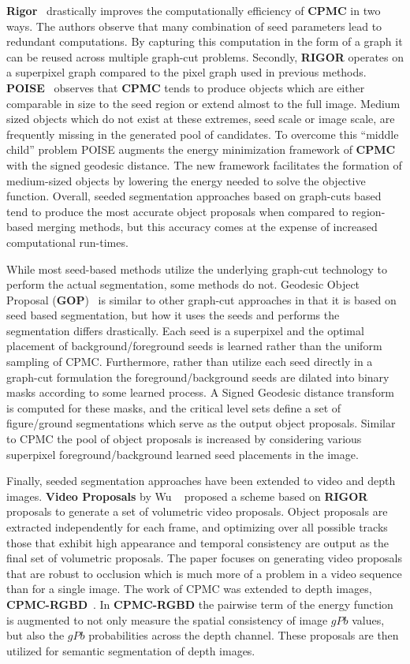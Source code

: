 {\bf Rigor}~\cite{Humayun:etal:CVPR14} drastically improves the computationally efficiency of {\bf CPMC} in two ways. The authors observe that many combination of seed parameters lead to redundant computations. By capturing this computation in the form of a graph it can be reused across multiple graph-cut problems. Secondly, {\bf RIGOR} operates on a superpixel graph compared to the pixel graph used in previous methods. {\bf POISE}~\cite{Humayun:etal:ICCV15} observes that {\bf CPMC} tends to produce objects which are either comparable in size to the seed region or extend almost to the full image. Medium sized objects which do not exist at these extremes, seed scale or image scale, are frequently missing in the generated pool of candidates. To overcome this ``middle child'' problem POISE augments the energy minimization framework of {\bf CPMC} with the signed geodesic distance. The new framework facilitates the formation of medium-sized objects by lowering the energy needed to solve the objective function. Overall, seeded segmentation approaches based on graph-cuts based tend to produce the most accurate object proposals when compared to region-based merging methods, but this accuracy comes at the expense of increased computational run-times. 

While most seed-based methods utilize the underlying graph-cut technology to perform the actual segmentation, some methods do not. Geodesic Object Proposal ({\bf GOP})~\cite{Krahenbuhl:Koltun:ECCV14} is  similar to other graph-cut approaches in that it is based on seed based segmentation, but how it uses the seeds and performs the segmentation differs drastically. Each seed is a superpixel and the optimal placement of background/foreground seeds is learned rather than the uniform sampling of CPMC. Furthermore, rather than utilize each seed directly in a graph-cut formulation the foreground/background seeds are dilated into binary masks according to some learned process. A Signed Geodesic distance transform is computed for these masks, and the critical level sets define a set of figure/ground segmentations which serve as the output object proposals. Similar to CPMC the pool of object proposals is increased by considering various superpixel foreground/background learned seed placements in the image.

Finally, seeded segmentation approaches have been extended to video and depth images. {\bf Video Proposals} by Wu \etal~\cite{Wu:etal:CVPR15} proposed a scheme based on {\bf RIGOR} proposals to generate a set of volumetric video proposals. Object proposals are extracted independently for each frame, and optimizing over all possible tracks those that exhibit high appearance and temporal consistency are output as the final set of volumetric proposals. The paper focuses on generating video proposals that are robust to occlusion which is much more of a problem in a video sequence than for a single image. The work of CPMC was extended to depth images, {\bf CPMC-RGBD}~\cite{Banica:Sminchisescu:CVPR15}. In {\bf CPMC-RGBD} the pairwise term of the energy function is augmented to not only measure the spatial consistency of image $gPb$ values, but also the $gPb$ probabilities across the depth channel. These proposals are then utilized for semantic segmentation of depth images. 

